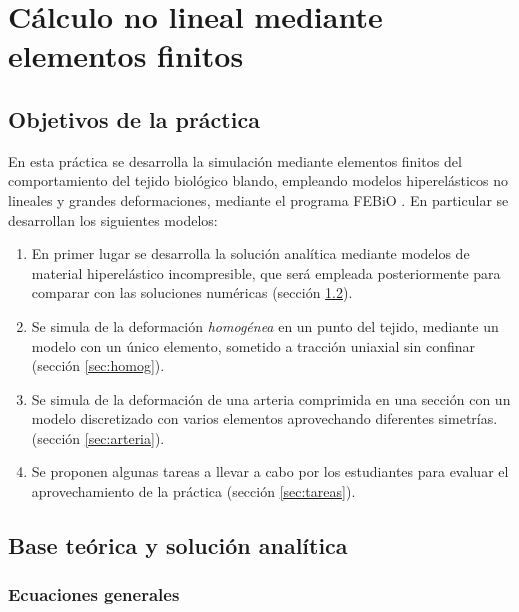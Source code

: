 \chapter{Cálculo no lineal mediante elementos finitos}
\label{cap3}


\section{Objetivos de la práctica}
\label{sec:objetivos}

En esta práctica se desarrolla la simulación mediante elementos finitos del comportamiento del tejido biológico blando, empleando modelos hiperelásticos no lineales y grandes deformaciones, mediante el programa FEBiO \cite{FEBiO}.
En particular se desarrollan los siguientes modelos:
\begin{enumerate}
	\item
	En primer lugar se desarrolla la solución analítica mediante modelos de material hiperelástico incompresible, que será empleada posteriormente para comparar con las soluciones numéricas (sección \ref{sec:anal}).
	\item
	Se simula de la deformación \emph{homogénea} en un punto del tejido, mediante un modelo con un único elemento, sometido a tracción uniaxial sin confinar (sección \ref {sec:homog}).
	\item
	Se simula de la deformación de una arteria comprimida en una sección con un modelo discretizado con varios elementos aprovechando diferentes simetrías.  (sección \ref {sec:arteria}).
	\item
	Se proponen algunas tareas a llevar a cabo por los estudiantes para evaluar el aprovechamiento de la práctica (sección \ref{sec:tareas}).
\end{enumerate}


\section{Base teórica y solución analítica}
\label{sec:anal}

\subsection{Ecuaciones generales}

